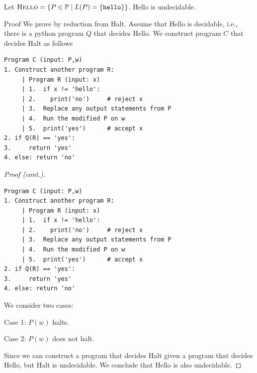 \begin{frame}[fragile=true]
  \begin{lemma}
    Let $\textsc{Hello} = \{ P\in{\mathbb P} \;|\;
    L(P)=\{\texttt{hello}\}\}$.
    {\sc Hello} is undecidable.
  \end{lemma}
  \begin{block}{Proof}
      We prove by reduction from {\sc Halt}.  Assume that {\sc Hello}
      is decidable, i.e., there is a python program $Q$ that decides
      {\sc Hello}.  We construct program $C$ that decides {\sc Halt}
      as follows

      {\footnotesize
\begin{verbatim}
Program C (input: P,w)
1. Construct another program R:
     | Program R (input: x)
     | 1.  if x != 'hello':
     | 2.    print('no')     # reject x
     | 3.  Replace any output statements from P
     | 4.  Run the modified P on w 
     | 5.  print('yes')      # accept x
2. if Q(R) == 'yes':
3.     return 'yes'
4. else: return 'no'
\end{verbatim}
      }
  \end{block}
\end{frame}


\begin{frame}[fragile=true]
  \begin{proof}[Proof (cont.)]
    {\tiny
\begin{verbatim}
Program C (input: P,w)
1. Construct another program R:
     | Program R (input: x)
     | 1.  if x != 'hello':
     | 2.    print('no')     # reject x
     | 3.  Replace any output statements from P
     | 4.  Run the modified P on w 
     | 5.  print('yes')      # accept x
2. if Q(R) == 'yes':
3.     return 'yes'
4. else: return 'no'
\end{verbatim}
    }
    {\small
      We consider two cases:

      Case 1: $P(w)$ halts. \pause

      Case 2: $P(w)$ does not halt. \pause

      Since we can construct a program that decides {\sc Halt} given a
      program that decides {\sc Hello}, but {\sc Halt} is undecidable.
      We conclude that {\sc Hello} is also undecidable.
    }
  \end{proof}
\end{frame}


